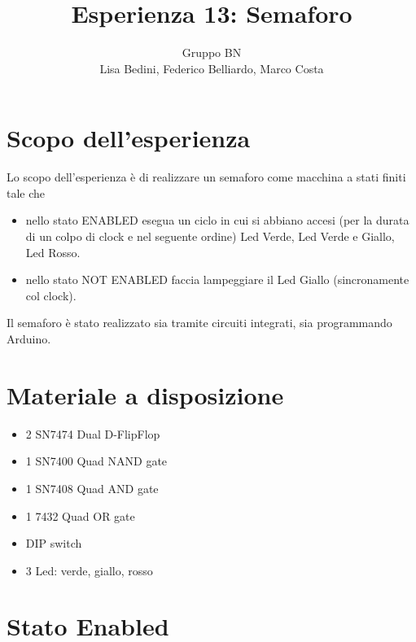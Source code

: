 \documentclass[10pt,a4paper]{article}
\author{Gruppo BN \\Lisa Bedini,  Federico Belliardo, Marco Costa}
\title{Esperienza 13: Semaforo}
\begin{document}
\maketitle

\section{Scopo dell'esperienza}
Lo scopo dell'esperienza è di realizzare un semaforo come macchina a stati finiti tale che
\begin{itemize}
\item nello stato ENABLED esegua un ciclo in cui si abbiano accesi (per la durata di un colpo di clock e nel seguente ordine) Led Verde, Led Verde e Giallo, Led Rosso.
\item nello stato NOT ENABLED faccia lampeggiare il Led Giallo (sincronamente  col clock).
\end{itemize}
Il semaforo è stato realizzato sia tramite circuiti integrati, sia programmando Arduino.

\section{Materiale a disposizione}
\begin{itemize}
\item 2 SN7474 Dual D-FlipFlop
\item 1 SN7400 Quad NAND gate
\item 1 SN7408 Quad AND gate
\item 1 7432 Quad OR gate
\item DIP switch
\item 3 Led: verde, giallo, rosso
\end{itemize}

\section{Stato Enabled}
\end{document}
